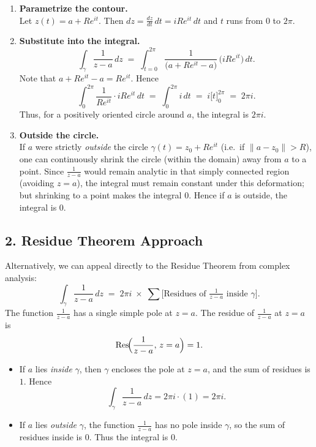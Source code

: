 \documentclass[12pt]{article}
\theoremstyle{definition} %
\theoremstyle{plain} %
\begin{document}
\begin{enumerate}
  \item \textbf{Parametrize the contour.}\\
    Let \(z(t) = a + Re^{it}\). Then \(\displaystyle dz = \frac{dz}{dt}\,dt = iRe^{it}\,dt\) and \(t\) runs from \(0\) to \(2\pi\).
    
  \item \textbf{Substitute into the integral.}\\
    \[
      \int_{\gamma} \frac{1}{z - a}\,dz
      \;=\;
      \int_{t=0}^{2\pi} \frac{1}{\bigl(a + Re^{it} - a\bigr)} \,\bigl(iRe^{it}\bigr)\,dt.
    \]
    Note that \(a + Re^{it} - a = Re^{it}\). Hence
    \[
      \int_{0}^{2\pi} \frac{1}{Re^{it}} \cdot iRe^{it}\,dt
      \;=\;
      \int_{0}^{2\pi} i\,dt 
      \;=\;
      i \bigl[t\bigr]_{0}^{2\pi}
      \;=\;
      2\pi i.
    \]
    Thus, for a positively oriented circle around \(a\), the integral is \(2\pi i\).

  \item \textbf{Outside the circle.}\\
    If \(a\) were strictly \emph{outside} the circle \(\gamma(t)=z_0+Re^{it}\) (i.e.\ if \(\|a - z_0\| > R\)), 
    one can continuously shrink the circle (within the domain) away from \(a\) to a point.  
    Since \(\frac{1}{z-a}\) would remain analytic in that simply connected region (avoiding \(z=a\)), 
    the integral must remain constant under this deformation; but shrinking to a point makes the integral \(0\).  
    Hence if \(a\) is outside, the integral is \(0\).
\end{enumerate}

\subsection*{2.\; Residue Theorem Approach}

Alternatively, we can appeal directly to the Residue Theorem from complex analysis:
\[
  \int_{\gamma} \frac{1}{z - a}\,dz
  \;=\;
  2\pi i\;\times\;\sum \bigl[\text{Residues of } \tfrac{1}{z-a}\text{ inside $\gamma$}\bigr].
\]
The function \(\tfrac{1}{z-a}\) has a single simple pole at \(z=a\). The residue of \(\tfrac{1}{z-a}\) at \(z=a\) is
\[
  \operatorname{Res}\!\Bigl(\frac{1}{z-a},\,z=a\Bigr)
  = 1.
\]
\begin{itemize}
  \item If \(a\) lies \emph{inside} \(\gamma\), then \(\gamma\) encloses the pole at \(z=a\), and the sum of residues is \(1\).  Hence
    \[
      \int_{\gamma} \frac{1}{z - a}\,dz 
      = 2\pi i \cdot (1) 
      = 2\pi i.
    \]
  \item If \(a\) lies \emph{outside} \(\gamma\), the function \(\frac{1}{z-a}\) has no pole inside \(\gamma\), so the sum of residues inside is \(0\).  Thus the integral is \(0\).
\end{itemize}
\end{document}
